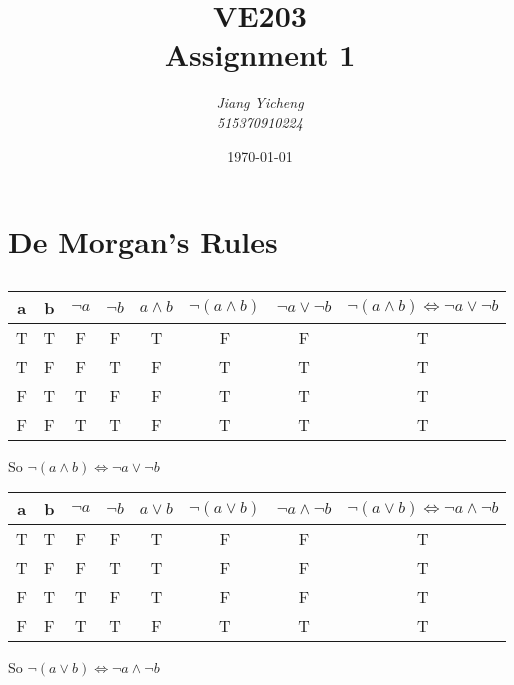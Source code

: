 \documentclass[a4paper,12pt,titlepage]{article}
\author{\textit{Jiang Yicheng}\\\textit{515370910224}}
\title{\textbf{VE203\\
		Assignment 1}}
\date{\today}
\begin{document}
\maketitle

\section{De Morgan's Rules}
\subsection{}
\begin{table}[ht]
\newcommand{\tabincell}[2]{\begin{tabular}{@{}#1@{}}#2\end{tabular}}
  \centering
\begin{tabular}{|c|c|c|c|c|c|c|c|}
\hline
\hline
a & b & $\neg a$ & $\neg b$ & $a \wedge b$ & $\neg (a \wedge b)$ & $\neg a \vee \neg b$  & $\neg(a \wedge b) \Leftrightarrow \neg a \vee \neg b$\\
\hline
T & T & F & F & T & F & F & T\\
\hline
T & F & F & T & F & T & T & T\\
\hline
F & T & T & F & F & T & T & T\\
\hline
F & F & T & T & F & T & T & T\\
\hline
\hline
\end{tabular}
\end{table}

So $\neg(a \wedge b) \Leftrightarrow \neg a \vee \neg b$

\begin{table}[ht]
\newcommand{\tabincell}[2]{\begin{tabular}{@{}#1@{}}#2\end{tabular}}
  \centering
\begin{tabular}{|c|c|c|c|c|c|c|c|}
\hline
\hline
a & b & $\neg a$ & $\neg b$ & $a \vee b$ & $\neg (a \vee b)$ & $\neg a \wedge \neg b$ &   $\neg(a \vee b) \Leftrightarrow \neg a \wedge \neg b$ \\
\hline
T & T & F & F & T & F & F &  T\\
\hline
T & F & F & T & T & F & F &  T\\
\hline
F & T & T & F & T & F & F & T\\
\hline
F & F & T & T & F & T & T & T\\
\hline
\hline
\end{tabular}
\end{table}
So $\neg(a \vee b) \Leftrightarrow \neg a \wedge \neg b$
\end{document}
